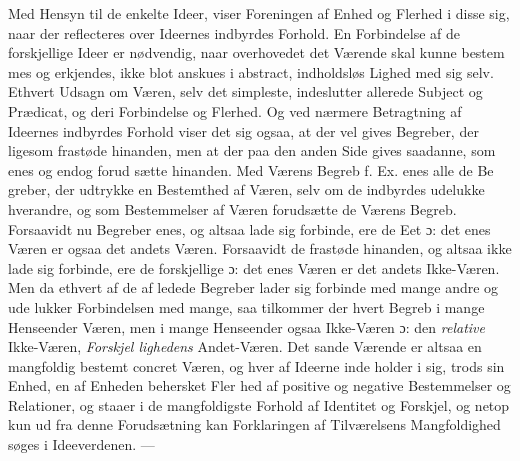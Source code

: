 \documentclass[12pt,a4paper]{book}
\begin{document}
Med Hensyn til de enkelte Ideer, viser Foreningen af
Enhed og Flerhed i disse sig, naar der reflecteres over Ideernes
indbyrdes Forhold. En Forbindelse af de forskjellige Ideer er
nødvendig, naar overhovedet det Værende skal kunne bestem\-%
mes og erkjendes, ikke blot anskues i abstract, indholdsløs
Lighed med sig selv. Ethvert Udsagn om Væren, selv det
simpleste, indeslutter allerede Subject og Prædicat, og deri
Forbindelse og Flerhed. Og ved nærmere Betragtning af
Ideernes indbyrdes Forhold viser det sig ogsaa, at der vel
gives Begreber, der ligesom frastøde hinanden, men at der
paa den anden Side gives saadanne, som enes og endog forud\-%
sætte hinanden. Med Værens Begreb f. Ex. enes alle de Be\-%
greber, der udtrykke en Bestemthed af Væren, selv om de
indbyrdes udelukke hverandre, og som Bestemmelser af Væren
forudsætte de Værens Begreb. Forsaavidt nu Begreber enes,
og altsaa lade sig forbinde, ere de Eet ɔ: det enes Væren er
ogsaa det andets Væren. Forsaavidt de frastøde hinanden, og
altsaa ikke lade sig forbinde, ere de forskjellige ɔ: det enes
Væren er det andets Ikke-Væren. Men da ethvert af de af\-%
ledede Begreber lader sig forbinde med mange andre og ude\-%
lukker Forbindelsen med mange, saa tilkommer der hvert
Begreb i mange Henseender Væren, men i mange Henseender
ogsaa Ikke-Væren ɔ: den \emph{relative} Ikke-Væren, \emph{Forskjel\-%
lighedens} Andet-Væren. Det sande Værende er altsaa en
mangfoldig bestemt concret Væren, og hver af Ideerne inde\-%
holder i sig, trods sin Enhed, en af Enheden behersket Fler\-%
hed af positive og negative Bestemmelser og Relationer, og
staaer i de mangfoldigste Forhold af Identitet og Forskjel, og
netop kun ud fra denne Forudsætning kan Forklaringen af
Tilværelsens Mangfoldighed søges i Ideeverdenen. ---
\end{document}
